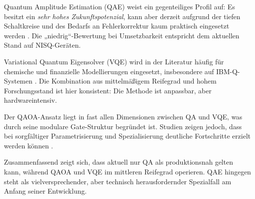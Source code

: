 Quantum Amplitude Estimation (QAE) weist ein gegenteiliges Profil auf: Es besitzt ein \emph{sehr hohes Zukunftspotenzial}, kann aber derzeit aufgrund der tiefen Schaltkreise und des Bedarfs an Fehlerkorrektur kaum praktisch eingesetzt werden \cite{bouland_prospects_2020, martin2022}. Die „niedrig“-Bewertung bei Umsetzbarkeit entspricht dem aktuellen Stand auf NISQ-Geräten.

Variational Quantum Eigensolver (VQE) wird in der Literatur häufig für chemische und finanzielle Modellierungen eingesetzt, insbesondere auf IBM-Q-Systemen \cite{buonaiuto_best_2023}. Die Kombination aus mittelmäßigem Reifegrad und hohem Forschungsstand ist hier konsistent: Die Methode ist anpassbar, aber hardwareintensiv.

Der QAOA-Ansatz liegt in fast allen Dimensionen zwischen QA und VQE, was durch seine modulare Gate-Struktur begründet ist. Studien zeigen jedoch, dass bei sorgfältiger Parametrisierung und Spezialisierung deutliche Fortschritte erzielt werden können \cite{brandhofer_benchmarking_2022}.

Zusammenfassend zeigt sich, dass aktuell nur QA als produktionsnah gelten kann, während QAOA und VQE im mittleren Reifegrad operieren. QAE hingegen steht als vielversprechender, aber technisch herausfordernder Spezialfall am Anfang seiner Entwicklung.








